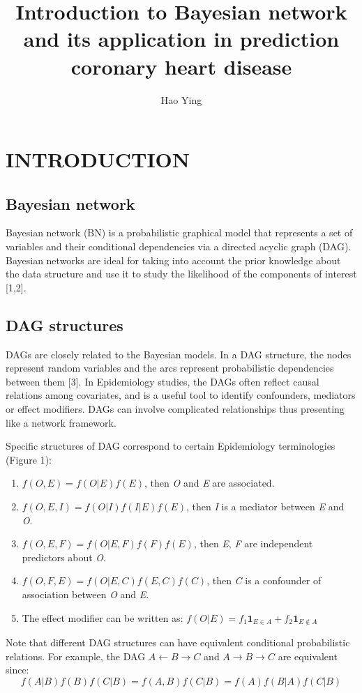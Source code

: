 \documentclass{article}
\title {\textbf{Introduction to Bayesian network and its application in prediction coronary heart disease}}
\author[a]{Hao Ying}
\affil[a]{Department of Biostatistics, School of Public Health Science, University of Miami, USA}
\date{}
\begin{document}
\maketitle





\section{INTRODUCTION}
\subsection{Bayesian network}
Bayesian network (BN) is a probabilistic graphical model that represents a set of variables and their conditional dependencies via a directed acyclic graph (DAG). Bayesian networks are ideal for taking into account the prior knowledge about the data structure and use it to study the likelihood of the components of interest [1,2].


\subsection{DAG structures}
DAGs are closely related to the Bayesian models. In a DAG structure, the nodes represent random variables and the arcs represent probabilistic dependencies between them [3]. In Epidemiology studies, the DAGs often reflect causal relations among covariates, and is a useful tool to identify confounders, mediators or effect modifiers. DAGs can involve complicated relationships thus presenting like a network framework. \par

Specific structures of DAG correspond to certain Epidemiology terminologies (Figure 1): 
\vspace{-1.5em}
\begin{enumerate}
\setlength\itemsep{0em}
\setlength\itemindent{-1em}
	\item   $f(O,E)=f(O|E)f(E)$, then \textit{O} and \textit{E} are associated. 
       \item  $f(O,E,I)=f(O|I)f(I|E)f(E)$, then \textit{I} is a mediator between \textit{E} and \textit{O}. 
	\item   $f(O,E,F)=f(O|E,F)f(F)f(E)$, then \textit{E}, \textit{F} are independent predictors about \textit{O}. 
	\item  $f(O,F,E)=f(O|E,C)f(E,C)f(C)$, then \textit{C} is a confounder of association between \textit{O} and \textit{E}. 
	\item The effect modifier can be written as:  $f(O|E)=f_{1}\mathbf{1}_{E\in A}+f_{2}\mathbf{1}_{E\notin A}$
\end{enumerate}
\vspace{-1.5em}
Note that different DAG structures can have equivalent conditional probabilistic relations. For example, the DAG $A\gets B\rightarrow C$ and $A\rightarrow B\rightarrow C$ are equivalent since:
\vspace{-0.5em}
\[f(A|B)f(B)f(C|B)=f(A,B)f(C|B)=f(A)f(B|A)f(C|B)\] \par
\end{document}
